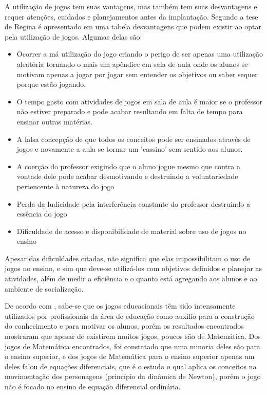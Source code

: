 A utilização de jogos tem suas vantagens, mas também tem suas desvantagens e requer atenções, cuidados e planejamentos antes da implantação. Segundo a tese de Regina \cite{vantDesvant} é apresentado em uma tabela desvantagens que podem existir ao optar pela utilização de jogos. Algumas delas são:

\begin{itemize}
	\item{Ocorrer a má utilização do jogo criando o perigo de ser apenas uma utilização aleatória tornando-o mais um apêndice em sala de aula onde os alunos se motivam apenas a jogar por jogar sem entender os objetivos ou saber sequer porque estão jogando.}

	\item{O tempo gasto com atividades de jogos em sala de aula é maior se o professor não estiver preparado e pode acabar resultando em falta de tempo para ensinar outras matérias.}

	\item{A falsa concepção de que todos os conceitos pode ser ensinados através de jogos e novamente a aula se tornar um 'cassino' sem sentido aos alunos.}

	\item{A coerção do professor exigindo que o aluno jogue mesmo que contra a vontade dele pode acabar desmotivando e destruindo a voluntariedade pertencente à natureza do jogo}

	\item{Perda da ludicidade pela interferência constante do professor destruindo a essência do jogo}

	\item{Dificuldade de acesso e disponibilidade de material sobre uso de jogos no ensino}
\end{itemize}

Apesar das dificuldades citadas, não significa que elas impossibilitam o uso de jogos no ensino, e sim que deve-se utilizá-los com objetivos definidos e planejar as atividades, além de medir a eficiência e o quanto está agregando aos alunos e ao ambiente de socialização.

De acordo com \cite{Nunes}, sabe-se que os jogos educacionais têm sido intensamente utilizados por profissionais da área de educação como auxílio para a construção do conhecimento e para motivar os alunos, porém os resultados encontrados mostraram que apesar de existirem muitos jogos, poucos são de Matemática. Dos jogos de Matemática encontrados, foi constatado que uma minoria deles são para o ensino superior, e dos jogos de Matemática para o ensino superior apenas um deles falou de equações diferenciais, que é o estudo \cite{videoGameED} o qual aplica os conceitos na movimentação dos personagens (princípio da dinâmica de Newton), porém o jogo não é focado no ensino de equação diferencial ordinária.

